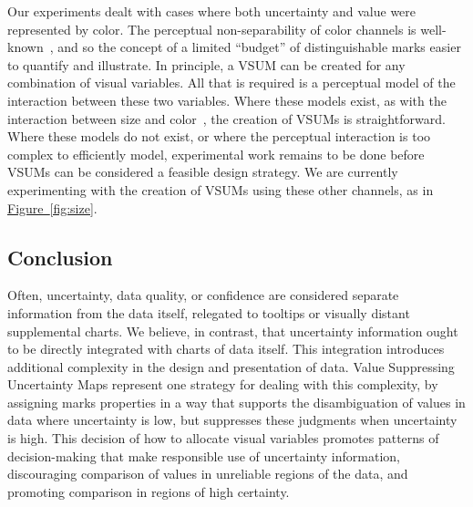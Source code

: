 \documentclass{vgtc}                          %
\newcommand{\figref}[1]{\hyperref[#1]{Figure~\ref*{#1}}}
\begin{document}
Our experiments dealt with cases where both uncertainty and value were represented by color. The perceptual non-separability of color channels is well-known~\cite{garner1970integrality, ware2012information}, and so the concept of a limited ``budget'' of distinguishable marks easier to quantify and illustrate. In principle, a VSUM can be created for any combination of visual variables. All that is required is a perceptual model of the interaction between these two variables. Where these models exist, as with the interaction between size and color~\cite{stone2014engineering}, the creation of VSUMs is straightforward. Where these models do not exist, or where the perceptual interaction is too complex to efficiently model, experimental work remains to be done before VSUMs can be considered a feasible design strategy. We are currently experimenting with the creation of VSUMs using these other channels, as in \figref{fig:size}.

\subsection{Conclusion}

Often, uncertainty, data quality, or confidence are considered separate information from the data itself, relegated to tooltips or visually distant supplemental charts. We believe, in contrast, that uncertainty information ought to be directly integrated with charts of data itself. This integration introduces additional complexity in the design and presentation of data. Value Suppressing Uncertainty Maps represent one strategy for dealing with this complexity, by assigning marks properties in a way that supports the disambiguation of values in data where uncertainty is low, but suppresses these judgments when uncertainty is high. This decision of how to allocate visual variables promotes patterns of decision-making that make responsible use of uncertainty information, discouraging comparison of values in unreliable regions of the data, and promoting comparison in regions of high certainty.


%

%
%
%


\end{document}
